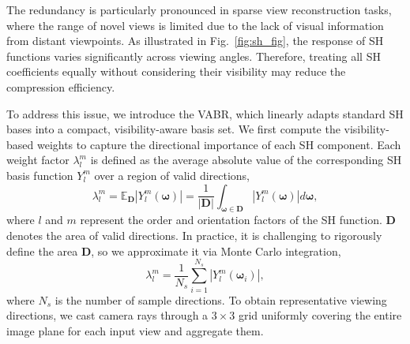 \documentclass[lettersize,journal]{IEEEtran}
\begin{document}
The redundancy is particularly pronounced in sparse view reconstruction tasks, where the range of novel views is limited due to the lack of visual information from distant viewpoints. 
As illustrated in Fig.~\ref{fig:sh_fig}, the response of SH functions varies significantly across viewing angles. Therefore, treating all SH coefficients equally without considering their visibility may reduce the compression efficiency.

To address this issue, we introduce the VABR, which linearly adapts standard SH bases into a compact, visibility-aware basis set. We first compute the visibility-based weights to capture the directional importance of each SH component. Each weight factor $\lambda_l^m$ is defined as the average absolute value of the corresponding SH basis function $Y_l^m$ over a region of valid directions,
\begin{equation}
    \lambda_l^m=\mathbb{E}_{\boldsymbol{D}}|Y_l^m(\boldsymbol{\omega})|=\frac{1}{|\boldsymbol{D}|}\int_{\boldsymbol{\omega} \in \boldsymbol{D}}|Y_l^m (\boldsymbol{\omega})|d\boldsymbol{\omega},
\end{equation}
where $l$ and $m$ represent the order and orientation factors of the SH function. $\boldsymbol{D}$ denotes the area of valid directions. In practice, it is challenging to rigorously define the area $\boldsymbol{D}$, so we approximate it via Monte Carlo integration,
\begin{equation}
    \lambda_l^m=\frac{1}{N_s}\sum_{i=1}^{N_s}|Y_l^m(\boldsymbol{\omega}_i)|,
\end{equation}
where $N_{s}$ is the number of sample directions.
To obtain representative viewing directions, we cast camera rays through a $3 \times 3$ grid uniformly covering the entire image plane for each input view and aggregate them.
\end{document}

